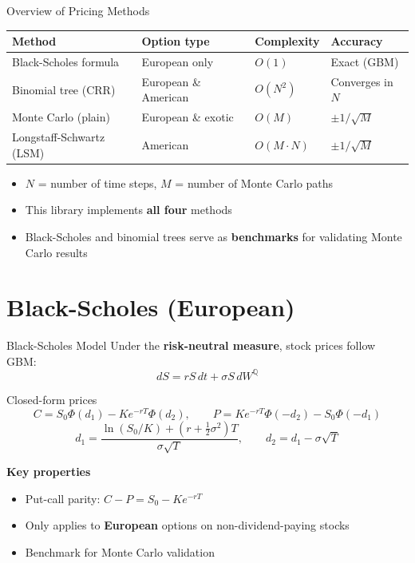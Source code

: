 \documentclass[aspectratio=169,10pt]{beamer}
\newcommand{\highlight}[1]{\textcolor{amred}{\textbf{#1}}}
\newcommand{\Q}{\mathbb{Q}}
\begin{document}
\begin{frame}{Overview of Pricing Methods}
  \begin{tabular}{llll}
    \toprule
    Method & Option type & Complexity & Accuracy \\
    \midrule
    Black-Scholes formula    & European only  & $O(1)$       & Exact (GBM) \\
    Binomial tree (CRR)      & European \& American & $O(N^2)$ & Converges in $N$ \\
    Monte Carlo (plain)      & European \& exotic & $O(M)$ & $\pm 1/\sqrt{M}$ \\
    Longstaff-Schwartz (LSM) & American       & $O(M \cdot N)$ & $\pm 1/\sqrt{M}$ \\
    \bottomrule
  \end{tabular}

  \bigskip
  \begin{itemize}
    \item $N$ = number of time steps, $M$ = number of Monte Carlo paths
    \item This library implements \textbf{all four} methods
    \item Black-Scholes and binomial trees serve as \textbf{benchmarks} for
          validating Monte Carlo results
  \end{itemize}
\end{frame}

\section{Black-Scholes (European)}

\begin{frame}{Black-Scholes Model}
  Under the \textbf{risk-neutral measure}, stock prices follow GBM:
  \[
    dS = r S\,dt + \sigma S\,dW^{\Q}
  \]

  \begin{block}{Closed-form prices}
    \[
      C = S_0 \Phi(d_1) - K e^{-rT} \Phi(d_2), \qquad
      P = K e^{-rT} \Phi(-d_2) - S_0 \Phi(-d_1)
    \]
    \[
      d_1 = \frac{\ln(S_0/K) + (r + \tfrac{1}{2}\sigma^2)T}{\sigma\sqrt{T}},
      \qquad d_2 = d_1 - \sigma\sqrt{T}
    \]
  \end{block}

  \bigskip
  \textbf{Key properties}
  \begin{itemize}
    \item Put-call parity: $C - P = S_0 - K e^{-rT}$
    \item Only applies to \highlight{European} options on non-dividend-paying stocks
    \item Benchmark for Monte Carlo validation
  \end{itemize}
\end{frame}
\end{document}
